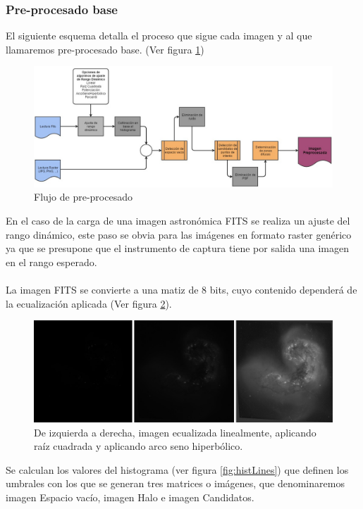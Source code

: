 	\subsubsection{Pre-procesado base}
	El siguiente esquema detalla el proceso que sigue cada imagen y al que llamaremos pre-procesado base. (Ver figura \ref{fig:esquemaPreprocesado})\\
	\begin{figure}[!htb]
		\centering
		\includegraphics[width=1\textwidth]{images/tfg2016pipeline1.jpg}
		\caption{\label{fig:esquemaPreprocesado}Flujo de pre-procesado}
	\end{figure}
	En el caso de la carga de una imagen astronómica FITS se realiza un ajuste del rango dinámico, este paso se obvia para las imágenes en formato raster genérico ya que se presupone que el instrumento de captura tiene por salida una imagen en el rango esperado.\\ \\
	La imagen FITS se convierte a una matiz de 8 bits, cuyo contenido dependerá de la ecualización aplicada (Ver figura \ref{fig:distintasEqu}).\\
	\begin{figure}[!htb]
		\centering
		\includegraphics[width=1\textwidth]{images/ecu_lineal_sqr_asinh.jpg}
		\caption{\label{fig:distintasEqu}{\small De izquierda a derecha, imagen ecualizada linealmente, aplicando raíz cuadrada y aplicando arco seno hiperbólico.}}
	\end{figure}
	Se calculan los valores del histograma (ver figura \ref{fig:histLines}) que definen los umbrales con los que se generan tres matrices o imágenes, que denominaremos imagen {\scriptsize Espacio vacío}, imagen {\scriptsize Halo} e imagen {\scriptsize Candidatos}.\\ 
